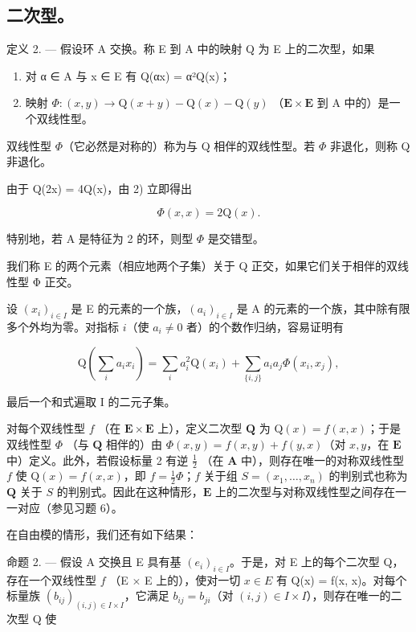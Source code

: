 \subsection{二次型。}

定义 2. --- 假设环 A 交换。称 E 到 A 中的映射 Q 为 E 上的二次型，如果

\begin{enumerate}
\def\labelenumi{\arabic{enumi})}
\item
  对 α ∈ A 与 x ∈ E 有 Q(αx) = α²Q(x)；
\item
  映射 \(\Phi : (x, y) \to \mathrm{Q}(x + y) - \mathrm{Q}(x) - \mathrm{Q}(y)\) （\(\mathbf{E} \times \mathbf{E}\) 到 A 中的）是一个双线性型。
\end{enumerate}

双线性型 \(\Phi\)（它必然是对称的）称为与 Q 相伴的双线性型。若 \(\Phi\) 非退化，则称 Q 非退化。

由于 Q(2x) = 4Q(x)，由 2) 立即得出

\[
\Phi (x, x) = 2 \mathrm{Q} (x).\tag{13}
\]

特别地，若 A 是特征为 2 的环，则型 \(\Phi\) 是交错型。

我们称 E 的两个元素（相应地两个子集）关于 Q 正交，如果它们关于相伴的双线性型 Φ 正交。

设 \((x_{i})_{i\in I}\) 是 E 的元素的一个族，\((a_{i})_{i\in I}\) 是 A 的元素的一个族，其中除有限多个外均为零。对指标 \(i\)（使 \(a_{i}\neq0\) 者）的个数作归纳，容易证明有

\[
\mathrm{Q} (\sum_ {i} a _ {i} x _ {i}) = \sum_ {i} a _ {i} ^ {2} \mathrm{Q} (x _ {i}) + \sum_ {\{i, j \}} a _ {i} a _ {j} \Phi (x _ {i}, x _ {j}),\tag{14}
\]

最后一个和式遍取 I 的二元子集。

对每个双线性型 \(f\) （在 \(\mathbf{E} \times \mathbf{E}\) 上），定义二次型 \(\mathbf{Q}\) 为 \(\mathrm{Q}(x) = f(x, x)\)；于是双线性型 \(\Phi\) （与 \(\mathbf{Q}\) 相伴的）由 \(\Phi(x, y) = f(x, y) + f(y, x)\)（对 \(x, y\)，在 \(\mathbf{E}\) 中）定义。此外，若假设标量 2 有逆 \(\frac{1}{2}\) （在 \(\mathbf{A}\) 中），则存在唯一的对称双线性型 \(f\) 使 \(\mathrm{Q}(x) = f(x, x)\)，即 \(f = \frac{1}{2}\Phi\)；\(f\) 关于组 \(S = (x_1, \ldots, x_n)\) 的判别式也称为 \(\mathbf{Q}\) 关于 \(S\) 的判别式。因此在这种情形，\(\mathbf{E}\) 上的二次型与对称双线性型之间存在一一对应（参见习题 6）。

在自由模的情形，我们还有如下结果：

命题 2. --- 假设 A 交换且 E 具有基 \((e_i)_{i \in I}\)。于是，对 E 上的每个二次型 Q，存在一个双线性型 \(f\) （E \(\times\) E 上的），使对一切 \(x \in E\) 有 Q(x) = f(x, x)。对每个标量族 \((b_{ij})_{(i,j) \in I \times I}\)，它满足 \(b_{ij} = b_{ji}\)（对 \((i, j) \in I \times I\)），则存在唯一的二次型 Q 使

